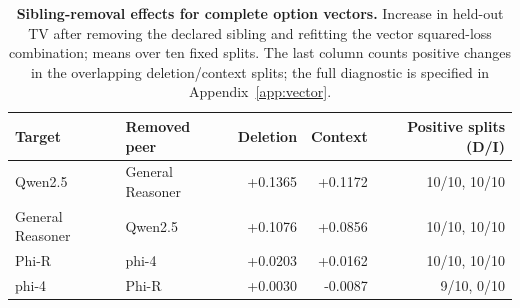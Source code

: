 \begin{table}[!ht]
\centering\small
\caption{\textbf{Sibling-removal effects for complete option vectors.} Increase in held-out TV after removing the declared sibling and refitting the vector squared-loss combination; means over ten fixed splits. The last column counts positive changes in the overlapping deletion/context splits; the full diagnostic is specified in Appendix~\ref{app:vector}.}
\label{tab:vector-sibling}
\begin{tabular}{llrrr}
\toprule
Target & Removed peer & Deletion & Context & Positive splits (D/I)\\
\midrule
Qwen2.5 & General Reasoner & +0.1365 & +0.1172 & 10/10, 10/10\\
General Reasoner & Qwen2.5 & +0.1076 & +0.0856 & 10/10, 10/10\\
Phi-R & phi-4 & +0.0203 & +0.0162 & 10/10, 10/10\\
phi-4 & Phi-R & +0.0030 & -0.0087 & 9/10, 0/10\\
\bottomrule
\end{tabular}
\end{table}

